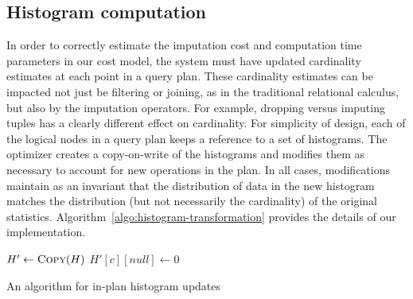 \subsection{Histogram computation}
In order to correctly estimate the imputation cost and computation time parameters in our cost model,  the system must have updated cardinality estimates
at each point in a query plan. These cardinality estimates can be impacted not just be filtering or joining, as in the traditional relational calculus, but also by
the imputation operators. For example,  dropping versus imputing tuples has a clearly different effect on cardinality. For simplicity of design,
each of the logical nodes in a query plan keeps a reference to a set of histograms. The optimizer creates a copy-on-write of the histograms and modifies them
as necessary to account for new operations in the plan. In all cases, modifications maintain as an invariant that the distribution of data in the new histogram
matches the distribution (but not necessarily the cardinality) of the original statistics. Algorithm~\ref{algo:histogram-transformation} provides the details
of our implementation.



\begin{algorithm}
  \begin{algorithmic}
    
	\EndIf
	\State $H' \gets \Call{Copy}{H}$
			\State $H'[c][null] \gets 0$
		\EndFor
			\State {}
		\EndFor
		\State {}
		\State {}
	\EndIf
    \EndFunction
  \end{algorithmic}
  \caption{An algorithm for in-plan histogram updates}
  \label{algo:histogram-transformation}
\end{algorithm}

